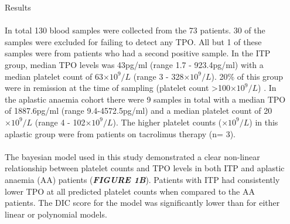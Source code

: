 \documentclass[landscape,a0paper,fontscale=0.285]{beamer} %
\newlength{\onecolwid}
\newlength{\twocolwid}
\begin{document}
\begin{frame}[t]
\begin{columns}[t]
\begin{column}{\twocolwid}
\begin{columns}[t,totalwidth=\twocolwid]
\begin{column}{\onecolwid}
\begin{block}{Results}
\paragraph{} In total 130 blood samples were collected from the 73 patients. 30 of the samples were excluded for failing to detect any TPO. All but 1 of these samples were from patients who had a second positive sample. In the ITP group, median TPO levels was 43pg/ml (range 1.7 - 923.4pg/ml) with a median platelet count of 63$\times 10^9/L$ (range 3 - 328$\times 10^9/L$). 20\% of this group were in remission at the time of sampling (platelet count >100$\times 10^9/L$) . In the aplastic anaemia cohort there were 9 samples in total with a median TPO of 1887.6pg/ml (range 9.4-4572.5pg/ml) and a median platelet count of 20$\times 10^9/L$ (range 4 - 102$\times 10^9/L$). The higher platelet counts ($\times 10^9/L$) in this aplastic group were from patients on tacrolimus therapy (n= 3). 

\vspace{30pt}

\paragraph{} The bayesian model used in this study demonstrated a clear non-linear relationship between platelet counts and TPO levels in both ITP and aplastic anaemia (AA) patients (\textbf{\emph{FIGURE 1B}}). Patients with ITP had consistently lower TPO at all predicted platelet counts when compared to the AA patients. The DIC score for the model was significantly lower than for either linear or polynomial models.

\end{block}



\end{column} %

\begin{column}{\onecolwid} %


\end{column}
\end{columns}
\end{column}
\end{columns}
\end{frame}
\end{document}
